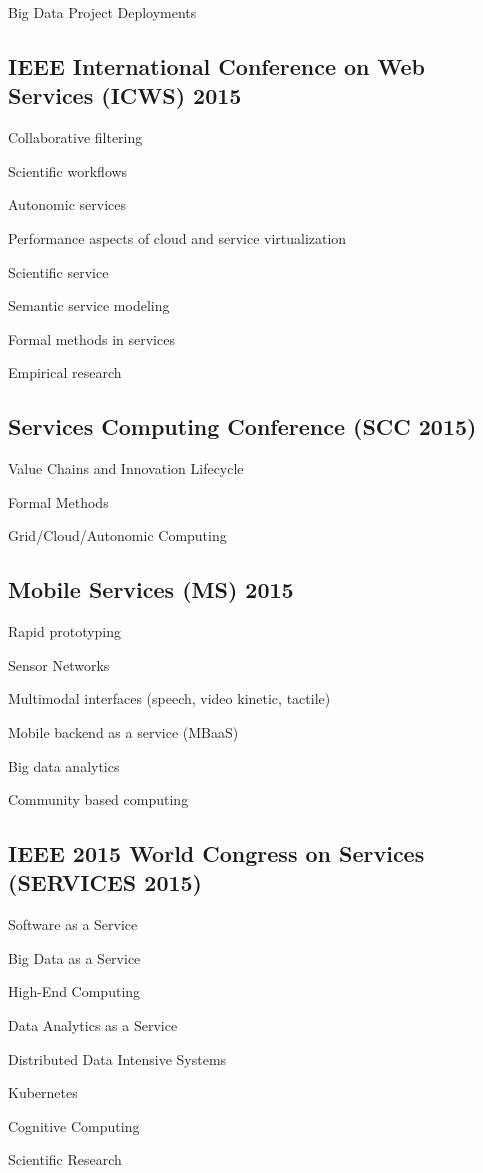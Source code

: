 \documentclass{report}
\begin{document}
Big Data Project Deployments

\subsection{IEEE International Conference on Web Services (ICWS) 2015}

Collaborative filtering

Scientific workflows

Autonomic services

Performance aspects of cloud and service virtualization

Scientific service

Semantic service modeling

Formal methods in services

Empirical research

\subsection{Services Computing Conference (SCC 2015)}
Value Chains and Innovation Lifecycle

Formal Methods

Grid/Cloud/Autonomic Computing

\subsection{Mobile Services (MS) 2015}
Rapid prototyping

Sensor Networks

Multimodal interfaces (speech, video kinetic, tactile)

Mobile backend as a service (MBaaS)

Big data analytics

Community based computing


\subsection{IEEE 2015 World Congress on Services (SERVICES 2015)}
Software as a Service

Big Data as a Service

High-End Computing

Data Analytics as a Service

Distributed Data Intensive Systems

Kubernetes

Cognitive Computing

Scientific Research
\end{document}
